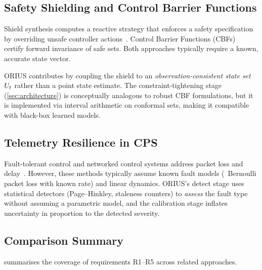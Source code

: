 \subsection{Safety Shielding and Control Barrier Functions}

Shield synthesis computes a reactive strategy that enforces a safety specification by
overriding unsafe controller actions~\cite{bloem2015shield}.  Control Barrier
Functions (CBFs)~\cite{ames2019control} certify forward invariance of safe sets.
Both approaches typically require a known, accurate state vector.

ORIUS contributes by coupling the shield to an \emph{observation-consistent state set}
$U_t$ rather than a point state estimate.  The constraint-tightening stage
(\cref{sec:architecture}) is conceptually analogous to robust CBF formulations, but it
is implemented via interval arithmetic on conformal sets, making it compatible with
black-box learned models.

\subsection{Telemetry Resilience in CPS}

Fault-tolerant control and networked control systems address packet loss and
delay~\cite{hespanha2007survey}.  However, these methods typically assume known
fault models (\eg~Bernoulli packet loss with known rate) and linear dynamics.
ORIUS's detect stage uses statistical detectors (Page--Hinkley, staleness counters)
to \emph{assess} the fault type without assuming a parametric model, and the
calibration stage inflates uncertainty in proportion to the detected severity.

\subsection{Comparison Summary}

 summarises the coverage of requirements R1--R5 across related
approaches.

